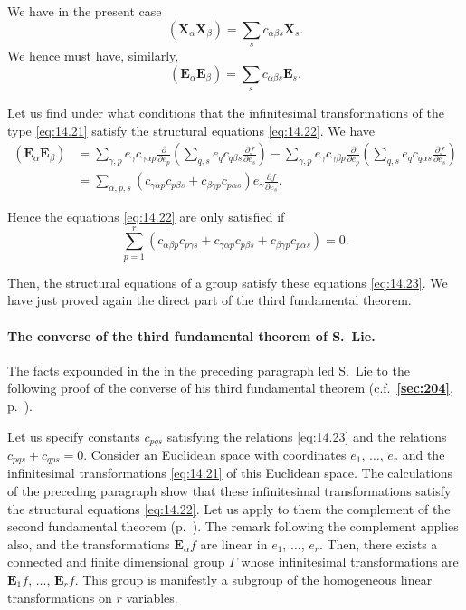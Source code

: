 \documentclass[leqno,11pt]{book}
\numberwithin{equation}{chapter}
\newcommand{\pd}{\partial}
\theoremstyle{shape1}
\theoremstyle{shapesmall}
\newcommand{\fsref}[1]{{\rm\textsection\textbf{\ref{sec:#1}}}}
\begin{document}
We have in the present case
\[
(\mathbf{X}_{\alpha}\mathbf{X}_{\beta})=\sum_{s}c_{\alpha\beta s}\mathbf{X}_{s}.
\]
We hence must have, similarly,
\begin{equation}
  \label{eq:14.22}
  (\mathbf{E}_{\alpha}\mathbf{E}_{\beta})=\sum_{s}c_{\alpha\beta s}\mathbf{E}_{s}.  
\end{equation}

Let us find under what conditions that the infinitesimal transformations of the type \eqref{eq:14.21} satisfy the structural equations \eqref{eq:14.22}. We have
\begin{align*}
  (\mathbf{E}_{\alpha}\mathbf{E}_{\beta})&=\sum_{\gamma,p}e_{\gamma}c_{\gamma\alpha p}\frac{\pd}{\pd e_{p}}\left(\sum_{q,s}e_{q}c_{q\beta s}\frac{\pd f}{\pd e_{s}}\right)-\sum_{\gamma,p}e_{\gamma}c_{\gamma\beta p}\frac{\pd}{\pd e_{p}}\left(\sum_{q,s}e_{q}c_{q\alpha s}\frac{\pd f}{\pd e_{s}}\right)\\
  &=\sum_{\alpha,p,s}(c_{\gamma\alpha p}c_{p\beta s}+c_{\beta\gamma p}c_{p\alpha s})e_{\gamma}\frac{\pd f}{\pd e_{s}}.
\end{align*}

Hence the equations \eqref{eq:14.22} are only satisfied if
\begin{equation}
  \label{eq:14.23}
  \sum_{p=1}^{r}(c_{\alpha\beta p}c_{p\gamma s}+c_{\gamma\alpha p}c_{p\beta s}+c_{\beta\gamma p}c_{p\alpha s})=0.
\end{equation}

Then, the structural equations of a group satisfy these equations \eqref{eq:14.23}. We have just proved again the direct part of the third fundamental theorem.

\paragraph{The converse of the third fundamental theorem of S.~Lie.}
\label{sec:218}
The facts expounded in the in the preceding paragraph led S.~Lie to the following proof of the converse of his third fundamental theorem (c.f.~\fsref{204}, p.~\pageref{sec:204}).

Let us specify constants $c_{pqs}$ satisfying the relations \eqref{eq:14.23} and the relations $c_{pqs}+c_{qps}=0$. Consider an Euclidean space with coordinates $e_{1}$, $\dots$, $e_{r}$ and the infinitesimal transformations \eqref{eq:14.21} of this Euclidean space. The calculations of the preceding paragraph show that these infinitesimal transformations satisfy the structural equations \eqref{eq:14.22}. Let us apply to them the complement of the second fundamental theorem (p.~\pageref{sec:211}). The remark following the complement applies also, and the transformations $\mathbf{E}_{\alpha}f$ are linear in $e_{1}$, $\dots$, $e_{r}$. Then, there exists a connected and finite dimensional group $\Gamma$ whose infinitesimal transformations are $\mathbf{E}_{1}f$, $\dots$, $\mathbf{E}_{r}f$. This group is manifestly a subgroup of the homogeneous linear transformations on $r$ variables.
\end{document}
